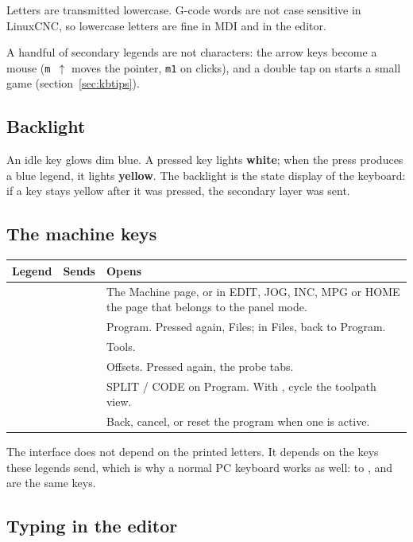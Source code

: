 Letters are transmitted lowercase. G-code words are not case sensitive in LinuxCNC, so
lowercase letters are fine in MDI and in the editor.

A handful of secondary legends are not characters: the arrow keys become a mouse
(\texttt{m\,$\uparrow$} moves the pointer, \texttt{m1} on  clicks), and a double tap
on  starts a small game (section~\ref{sec:kbtips}).

\subsection*{Backlight}

An idle key glows dim blue. A pressed key lights \textbf{white}; when the press produces a
blue legend, it lights \textbf{yellow}. The backlight is the state display of the keyboard:
if a key stays yellow after it was pressed, the secondary layer was sent.

\subsection*{The machine keys}

\begin{longtable}{L{3.4cm}L{2.6cm}L{7.6cm}}
  \toprule
  \textbf{Legend} & \textbf{Sends} & \textbf{Opens} \\
  \midrule
  \endhead
   &  & The Machine page, or in EDIT, JOG, INC, MPG or HOME the page that
        belongs to the panel mode. \\
   &  & Program. Pressed again, Files; in Files, back to Program. \\
   &  & Tools. \\
   &  & Offsets. Pressed again, the probe tabs. \\
   &  & SPLIT / CODE on Program. With , cycle the toolpath
        view. \\
   &  & Back, cancel, or reset the program when one is active. \\
  \bottomrule
\end{longtable}

The interface does not depend on the printed letters. It depends on the keys these legends
send, which is why a normal PC keyboard works as well:  to ,
 and  are the same keys.

\subsection*{Typing in the editor}

